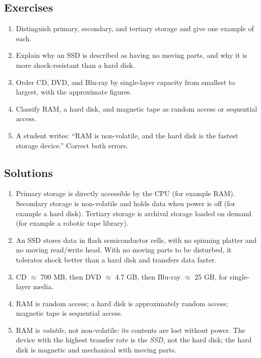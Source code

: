 \documentclass[11pt]{article}
\begin{document}
\subsection*{Exercises}
\begin{enumerate}[label=\arabic*.]
  \item Distinguish primary, secondary, and tertiary storage and give one
    example of each.
  \item Explain why an SSD is described as having no moving parts, and why it
    is more shock-resistant than a hard disk.
  \item Order CD, DVD, and Blu-ray by single-layer capacity from smallest to
    largest, with the approximate figures.
  \item Classify RAM, a hard disk, and magnetic tape as random access or
    sequential access.
  \item A student writes: ``RAM is non-volatile, and the hard disk is the
    fastest storage device.'' Correct both errors.
\end{enumerate}

\subsection*{Solutions}
\begingroup\small
\begin{enumerate}[label=\arabic*.]
  \item Primary storage is directly accessible by the CPU (for example RAM).
    Secondary storage is non-volatile and holds data when power is off (for
    example a hard disk). Tertiary storage is archival storage loaded on
    demand (for example a robotic tape library).
  \item An SSD stores data in flash semiconductor cells, with no spinning
    platter and no moving read/write head. With no moving parts to be
    disturbed, it tolerates shock better than a hard disk and transfers data
    faster.
  \item CD $\approx$ 700 MB, then DVD $\approx$ 4.7 GB, then Blu-ray
    $\approx$ 25 GB, for single-layer media.
  \item RAM is random access; a hard disk is approximately random access;
    magnetic tape is sequential access.
  \item RAM is \emph{volatile}, not non-volatile: its contents are lost
    without power. The device with the highest transfer rate is the
    \emph{SSD}, not the hard disk; the hard disk is magnetic and mechanical
    with moving parts.
\end{enumerate}
\endgroup
\end{document}
